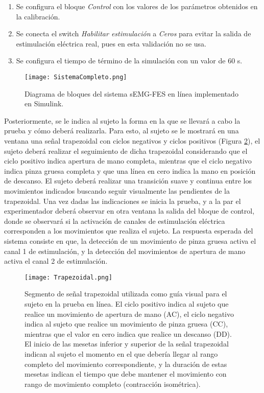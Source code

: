 \begin{enumerate}
	\item Se configura el bloque \emph{Control} con los valores de los parámetros obtenidos en la calibración.
	\item Se conecta el switch \emph{Habilitar estimulación} a \emph{Ceros} para evitar la salida de estimulación eléctrica real, pues en esta validación no se usa.
	\item Se configura el tiempo de término de la simulación con un valor de 60 s.
\end{enumerate}

\begin{figure}[htbp]
	\centering
	\texttt{[image: SistemaCompleto.png]}
	\caption{Diagrama de bloques del sistema sEMG-FES en línea implementado en Simulink\textregistered.}
	\label{Figura: SisComp}
\end{figure}

\newpage
Posteriormente, se le indica al sujeto la forma en la que se llevará a cabo la prueba y cómo deberá realizarla. Para esto, al sujeto se le mostrará en una ventana una señal trapezoidal con ciclos negativos y ciclos positivos (Figura \ref{Figura: Trapezoidal}), el sujeto deberá realizar el seguimiento de dicha trapezoidal considerando que el ciclo positivo indica apertura de mano completa, mientras que el ciclo negativo indica pinza gruesa completa y que una línea en cero indica la mano en posición de descanso. El sujeto deberá realizar una transición suave y continua entre los movimientos indicados buscando seguir visualmente las pendientes de la trapezoidal. Una vez dadas las indicaciones se inicia la prueba, y a la par el experimentador deberá observar en otra ventana la salida del bloque de control, donde se observará si la activación de canales de estimulación eléctrica corresponden a los movimientos que realiza el sujeto. La respuesta esperada del sistema consiste en que, la detección de un movimiento de pinza gruesa activa el canal 1 de estimulación, y la detección del movimientos de apertura de mano activa el canal 2 de estimulación.

\vfill
\begin{figure}[htbp]
	\centering
	\texttt{[image: Trapezoidal.png]}
	\caption[Segmento de señal trapezoidal patrón]{Segmento de señal trapezoidal utilizada como guía visual para el sujeto en la prueba en línea. El ciclo positivo indica al sujeto que realice un movimiento de apertura de mano (AC), el ciclo negativo indica al sujeto que realice un movimiento de pinza gruesa (CC), mientras que el valor en cero indica que realice un descanso (DD). El inicio de las mesetas inferior y superior de la señal trapezoidal indican al sujeto el momento en el que debería llegar al rango completo del movimiento correspondiente, y la duración de estas mesetas indican el tiempo que debe mantener el movimiento con rango de movimiento completo (contracción isométrica).}
	\label{Figura: Trapezoidal}
\end{figure}
\vfill

